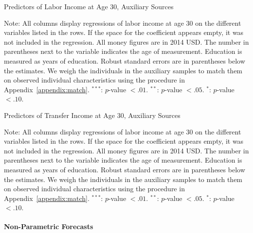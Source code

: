 \begin{table}
\begin{threeparttable}
\caption{Predictors of Labor Income at Age 30, Auxiliary Sources}
\label{table:predlaborincome}
\centering
\footnotesize

\begin{tablenotes}
\footnotesize
\item Note: All columns display regressions of labor income at age 30 on the different variables listed in the rows. If the space for the coefficient appears empty, it was not included in the regression. All money figures are in 2014 USD. The number in parentheses next to the variable indicates the age of measurement. Education is measured as years of education. Robust standard errors are in parentheses below the estimates. We weigh the individuals in the auxiliary samples to match them on observed individual characteristics using the procedure in Appendix~\ref{appendix:match}. $^{***}$: $p$-value $< .01$. $^{**}$: $p$-value $< .05$. $^{*}$: $p$-value $< .10$.
\end{tablenotes}
\end{threeparttable}
\end{table}

\begin{table}[H]
\begin{threeparttable}
\caption{Predictors of Transfer Income at Age 30, Auxiliary Sources}
\label{table:predtransferincome}
\centering
\footnotesize

\begin{tablenotes}
\footnotesize
\item Note: All columns display regressions of labor income at age 30 on the different variables listed in the rows. If the space for the coefficient appears empty, it was not included in the regression. All money figures are in 2014 USD. The number in parentheses next to the variable indicates the age of measurement. Education is measured as years of education. Robust standard errors are in parentheses below the estimates. We weigh the individuals in the auxiliary samples to match them on observed individual characteristics using the procedure in Appendix~\ref{appendix:match}. $^{***}$: $p$-value $< .01$. $^{**}$: $p$-value $< .05$. $^{*}$: $p$-value $< .10$.
\end{tablenotes}
\end{threeparttable}
\end{table}

\paragraph{Non-Parametric Forecasts} \label{appendix:nonpar}

